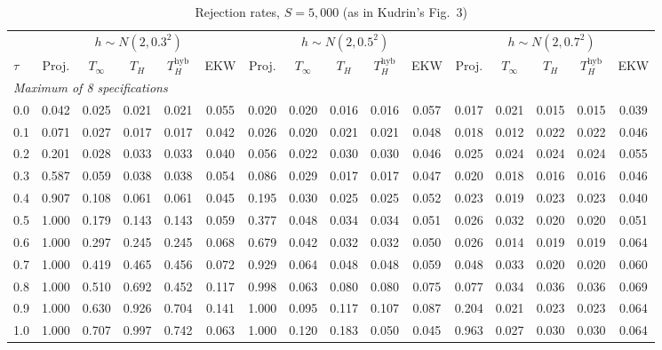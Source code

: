 \begin{table}[htbp]
\centering
\caption{Rejection rates, $S = 5{,}000$ (as in Kudrin's Fig.~3)}
\label{tab:kudrin_style_var_dial_S5000}
\footnotesize
\setlength{\tabcolsep}{4pt}
\begin{tabular}{lccccccccccccccc}
\toprule
 & \multicolumn{5}{c}{$h \sim N(2, 0.3^2)$} & \multicolumn{5}{c}{$h \sim N(2, 0.5^2)$} & \multicolumn{5}{c}{$h \sim N(2, 0.7^2)$} \\
\cmidrule(lr){2-6} \cmidrule(lr){7-11} \cmidrule(lr){12-16}
$\tau$ & Proj. & $T_\infty$ & $T_H$ & $T_H^{\mathrm{hyb}}$ & EKW & Proj. & $T_\infty$ & $T_H$ & $T_H^{\mathrm{hyb}}$ & EKW & Proj. & $T_\infty$ & $T_H$ & $T_H^{\mathrm{hyb}}$ & EKW \\
\midrule
\multicolumn{16}{l}{\textit{Maximum of 8 specifications}} \\
0.0 & 0.042 & 0.025 & 0.021 & 0.021 & 0.055 & 0.020 & 0.020 & 0.016 & 0.016 & 0.057 & 0.017 & 0.021 & 0.015 & 0.015 & 0.039 \\
0.1 & 0.071 & 0.027 & 0.017 & 0.017 & 0.042 & 0.026 & 0.020 & 0.021 & 0.021 & 0.048 & 0.018 & 0.012 & 0.022 & 0.022 & 0.046 \\
0.2 & 0.201 & 0.028 & 0.033 & 0.033 & 0.040 & 0.056 & 0.022 & 0.030 & 0.030 & 0.046 & 0.025 & 0.024 & 0.024 & 0.024 & 0.055 \\
0.3 & 0.587 & 0.059 & 0.038 & 0.038 & 0.054 & 0.086 & 0.029 & 0.017 & 0.017 & 0.047 & 0.020 & 0.018 & 0.016 & 0.016 & 0.046 \\
0.4 & 0.907 & 0.108 & 0.061 & 0.061 & 0.045 & 0.195 & 0.030 & 0.025 & 0.025 & 0.052 & 0.023 & 0.019 & 0.023 & 0.023 & 0.040 \\
0.5 & 1.000 & 0.179 & 0.143 & 0.143 & 0.059 & 0.377 & 0.048 & 0.034 & 0.034 & 0.051 & 0.026 & 0.032 & 0.020 & 0.020 & 0.051 \\
0.6 & 1.000 & 0.297 & 0.245 & 0.245 & 0.068 & 0.679 & 0.042 & 0.032 & 0.032 & 0.050 & 0.026 & 0.014 & 0.019 & 0.019 & 0.064 \\
0.7 & 1.000 & 0.419 & 0.465 & 0.456 & 0.072 & 0.929 & 0.064 & 0.048 & 0.048 & 0.059 & 0.048 & 0.033 & 0.020 & 0.020 & 0.060 \\
0.8 & 1.000 & 0.510 & 0.692 & 0.452 & 0.117 & 0.998 & 0.063 & 0.080 & 0.080 & 0.075 & 0.077 & 0.034 & 0.036 & 0.036 & 0.069 \\
0.9 & 1.000 & 0.630 & 0.926 & 0.704 & 0.141 & 1.000 & 0.095 & 0.117 & 0.107 & 0.087 & 0.204 & 0.021 & 0.023 & 0.023 & 0.064 \\
1.0 & 1.000 & 0.707 & 0.997 & 0.742 & 0.063 & 1.000 & 0.120 & 0.183 & 0.050 & 0.045 & 0.963 & 0.027 & 0.030 & 0.030 & 0.064 \\

\end{tabular}
\end{table}
